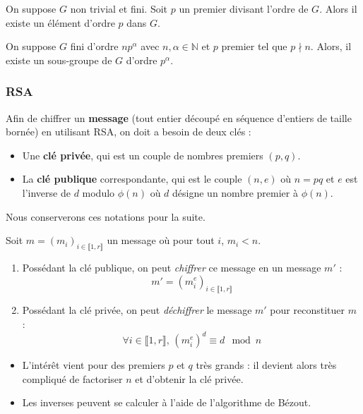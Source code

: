   \begin{application}
    On suppose $G$ non trivial et fini. Soit $p$ un premier divisant l'ordre de $G$. Alors il existe un élément d'ordre $p$ dans $G$.
  \end{application}


  \begin{application}
    On suppose $G$ fini d'ordre $n p^\alpha$ avec $n, \alpha \in \mathbb{N}$ et $p$ premier tel que $p \nmid n$. Alors, il existe un sous-groupe de $G$ d’ordre $p^\alpha$.
  \end{application}

  \subsubsection{RSA}


  \begin{definition}
    Afin de chiffrer un \textbf{message} (tout entier découpé en séquence d'entiers de taille bornée) en utilisant RSA, on doit a besoin de deux clés :
    \begin{itemize}
      \item Une \textbf{clé privée}, qui est un couple de nombres premiers $(p,q)$.
      \item La \textbf{clé publique} correspondante, qui est le couple $(n,e)$ où $n = pq$ et $e$ est l'inverse de $d$ modulo $\phi(n)$ où $d$ désigne un nombre premier à $\phi(n)$.
    \end{itemize}
  \end{definition}

  Nous conserverons ces notations pour la suite.

  \begin{theorem}
    Soit $m = (m_i)_{i \in \llbracket 1, r \rrbracket}$ un message où pour tout $i$, $m_i < n$.
    \begin{enumerate}[label=(\roman*)]
      \item Possédant la clé publique, on peut \textit{chiffrer} ce message en un message $m'$ :
      \[ m' = (m_i^e)_{i \in \llbracket 1, r \rrbracket} \]
      \item Possédant la clé privée, on peut \textit{déchiffrer} le message $m'$ pour reconstituer $m$ :
      \[ \forall i \in \llbracket 1, r \rrbracket, \, (m_i^e)^d \equiv d \mod n \]
    \end{enumerate}
  \end{theorem}

  \begin{remark}
    \begin{itemize}
      \item L'intérêt vient pour des premiers $p$ et $q$ très grands : il devient alors très compliqué de factoriser $n$ et d'obtenir la clé privée.
      \item Les inverses peuvent se calculer à l'aide de l'algorithme de Bézout.
    \end{itemize}
  \end{remark}


